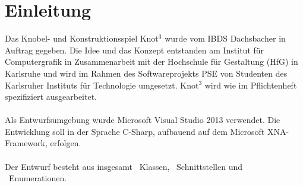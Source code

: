 \chapter{Einleitung}

Das Knobel- und Konstruktionsspiel Knot$^3$ wurde vom IBDS Dachsbacher in Auftrag gegeben. Die Idee und das Konzept entstanden am Institut für Computergrafik in Zusammenarbeit mit der Hochschule für Gestaltung (HfG) in Karlsruhe und wird im Rahmen des Softwareprojekts PSE von Studenten des Karlsruher Instituts für Technologie umgesetzt. Knot$^3$ wird wie im Pflichtenheft spezifiziert ausgearbeitet.
\\\\
Als Entwurfsumgebung wurde Microsoft Visual Studio 2013 verwendet. Die Entwicklung soll in der Sprache C-Sharp, aufbauend auf dem Microsoft XNA-Framework, erfolgen.
\\\\
Der Entwurf besteht aus insgesamt \CountClasses~Klassen, \CountInterfaces~Schnittstellen und \CountEnums~Enumerationen.